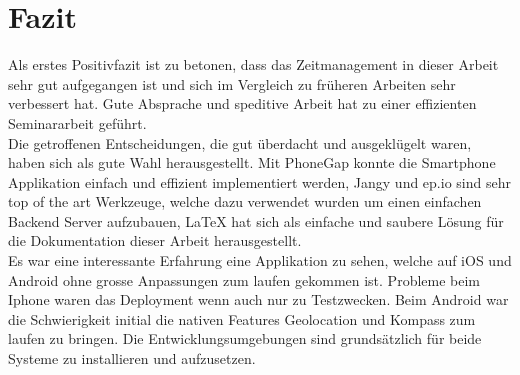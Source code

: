 
\newpage
\section{Fazit} %
\label{sec:Fazit}

Als erstes Positivfazit ist zu betonen, dass das Zeitmanagement in dieser Arbeit sehr gut aufgegangen ist und sich im Vergleich zu früheren Arbeiten sehr verbessert hat. Gute Absprache und speditive Arbeit hat zu einer effizienten Seminararbeit geführt.\\
Die getroffenen Entscheidungen, die gut überdacht und ausgeklügelt waren, haben sich als gute Wahl herausgestellt. Mit PhoneGap konnte die Smartphone Applikation einfach und effizient implementiert werden, Jangy und ep.io sind sehr top of the art Werkzeuge, welche dazu verwendet wurden um einen einfachen Backend Server aufzubauen, LaTeX hat sich als einfache und saubere Lösung für die Dokumentation dieser Arbeit herausgestellt.\\
Es war eine interessante Erfahrung eine Applikation zu sehen, welche auf iOS und Android ohne grosse Anpassungen zum laufen gekommen ist. Probleme beim Iphone waren das Deployment wenn auch nur zu Testzwecken. Beim Android war die Schwierigkeit initial die nativen Features Geolocation und Kompass zum laufen zu bringen. Die Entwicklungsumgebungen sind grundsätzlich für beide Systeme zu installieren und aufzusetzen. 

